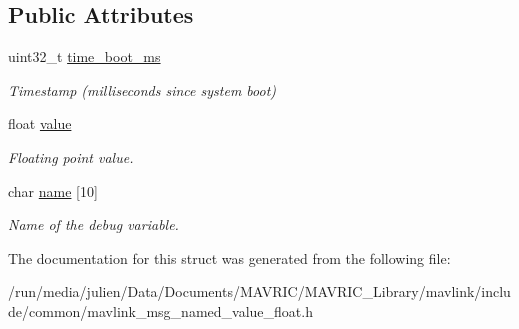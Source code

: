 \subsection*{Public Attributes}
\begin{DoxyCompactItemize}
\item 
\hypertarget{struct____mavlink__named__value__float__t_a46e6c60e5c779ce8f3e808c485aa620f}{uint32\+\_\+t \hyperlink{struct____mavlink__named__value__float__t_a46e6c60e5c779ce8f3e808c485aa620f}{time\+\_\+boot\+\_\+ms}}\label{struct____mavlink__named__value__float__t_a46e6c60e5c779ce8f3e808c485aa620f}

\begin{DoxyCompactList}\small\item\em Timestamp (milliseconds since system boot) \end{DoxyCompactList}\item 
\hypertarget{struct____mavlink__named__value__float__t_a44c8c857d4e8732bccb9ef9ed1e2a386}{float \hyperlink{struct____mavlink__named__value__float__t_a44c8c857d4e8732bccb9ef9ed1e2a386}{value}}\label{struct____mavlink__named__value__float__t_a44c8c857d4e8732bccb9ef9ed1e2a386}

\begin{DoxyCompactList}\small\item\em Floating point value. \end{DoxyCompactList}\item 
\hypertarget{struct____mavlink__named__value__float__t_a3898dace84b76ba862dcf18a24e7e395}{char \hyperlink{struct____mavlink__named__value__float__t_a3898dace84b76ba862dcf18a24e7e395}{name} \mbox{[}10\mbox{]}}\label{struct____mavlink__named__value__float__t_a3898dace84b76ba862dcf18a24e7e395}

\begin{DoxyCompactList}\small\item\em Name of the debug variable. \end{DoxyCompactList}\end{DoxyCompactItemize}


The documentation for this struct was generated from the following file\+:\begin{DoxyCompactItemize}
\item 
/run/media/julien/\+Data/\+Documents/\+M\+A\+V\+R\+I\+C/\+M\+A\+V\+R\+I\+C\+\_\+\+Library/mavlink/include/common/mavlink\+\_\+msg\+\_\+named\+\_\+value\+\_\+float.\+h\end{DoxyCompactItemize}
